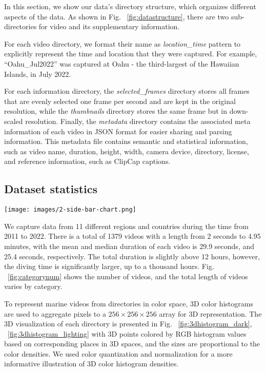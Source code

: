 \documentclass[runningheads]{llncs}
\begin{document}
In this section, we show our data's directory structure, which organizes different aspects of the data. As shown in Fig. ~\ref{fig:datastructure}, there are two sub-directories for video and its supplementary information. 

For each video directory, we format their name as \textit{location\_time} pattern to explicitly represent the time and location that they were captured. For example, ``Oahu\_Jul2022'' was captured at Oahu - the third-largest of the Hawaiian Islands, in July 2022. 

For each information directory, the \textit{selected\_frames} directory stores all frames that are evenly selected one frame per second and are kept in the original resolution, while the \textit{thumbnails} directory stores the same frame but in down-scaled resolution. Finally, the \textit{metadata} directory contains the associated meta information of each video in JSON format for easier sharing and parsing information. This metadata file contains semantic and statistical information, such as video name, duration, height, width, camera device, directory, license, and reference information, such as ClipCap captions. 

\subsection{Dataset statistics}

\begin{figure*}
\begin{center}
\centering
\texttt{[image: images/2-side-bar-chart.png]}
\end{center}
  \caption{The figure shows the number of videos and overall time duration for each region.}
\label{fig:categorynum}
\end{figure*}

We capture data from 11 different regions and countries during the time from 2011 to 2022. There is a total of 1379 videos with a length from 2 seconds to 4.95 minutes, with the mean and median duration of each video is 29.9 seconds, and 25.4 seconds, respectively. The total duration is slightly above 12 hours, however, the diving time is significantly larger, up to a thousand hours. Fig. ~\ref{fig:categorynum} shows the number of videos, and the total length of videos varies by category. 

To represent marine videos from directories in color space, 3D color histograms are used to aggregate pixels to a $256\times256\times256$ array for 3D representation. The 3D visualization of each directory is presented in Fig. ~\ref{fig:3dhistogram_dark}, ~\ref{fig:3dhistogram_lighting} with 3D points colored by RGB histogram values based on corresponding places in 3D spaces, and the sizes are proportional to the color densities. We used color quantization and normalization for a more informative illustration of 3D color histogram densities.
\end{document}
